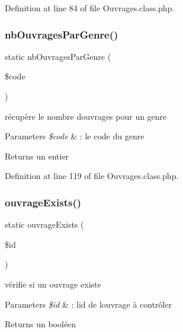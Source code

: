 Definition at line 84 of file Ouvrages.\+class.\+php.

\mbox{\label{class_ouvrages_a15c7d28c326ff43eaa69cfccf26ce061}} 
\subsubsection{\texorpdfstring{nb\+Ouvrages\+Par\+Genre()}{nbOuvragesParGenre()}}
{\footnotesize\ttfamily static nb\+Ouvrages\+Par\+Genre (\begin{DoxyParamCaption}\item[{}]{\$code }\end{DoxyParamCaption})\hspace{0.3cm}{\ttfamily [static]}}

récupère le nombre d\textquotesingle{}ouvrages pour un genre 
\begin{DoxyParams}{Parameters}
{\em \$code} & \+: le code du genre \\
\hline
\end{DoxyParams}
\begin{DoxyReturn}{Returns}
un entier 
\end{DoxyReturn}


Definition at line 119 of file Ouvrages.\+class.\+php.

\mbox{\label{class_ouvrages_ae6d9a43ac05125ac2e1d8f5b60bf5c8e}} 
\subsubsection{\texorpdfstring{ouvrage\+Exists()}{ouvrageExists()}}
{\footnotesize\ttfamily static ouvrage\+Exists (\begin{DoxyParamCaption}\item[{}]{\$id }\end{DoxyParamCaption})\hspace{0.3cm}{\ttfamily [static]}}

vérifie si un ouvrage existe 
\begin{DoxyParams}{Parameters}
{\em \$id} & \+: l\textquotesingle{}id de l\textquotesingle{}ouvrage à contrôler \\
\hline
\end{DoxyParams}
\begin{DoxyReturn}{Returns}
un booléen 
\end{DoxyReturn}


